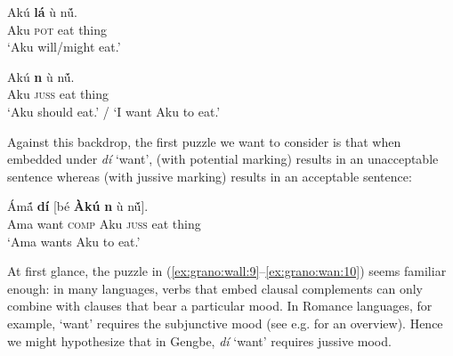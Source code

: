 \documentclass[output=paper,modfonts,nonflat]{langsci/langscibook}
\begin{document}
\ea \label{ex:grano:pot:7}
\gll Ak\'u \textbf{l\'a} {\D}\`u n\'{\~u}.\\
Aku \textsc{pot} eat thing\\
\glt `Aku will/might eat.' %
\z

\ea \label{ex:grano:juss:8}
\gll Ak\'u \textbf{n{\É}} {\D}\`u n\'{\~u}.\\
Aku \textsc{juss} eat thing\\
\glt`Aku should eat.' / `I want Aku to eat.' %
\z

Against this backdrop, the first puzzle we want to consider is that when embedded under \emph{d{\Z}\'i} `want',  (with potential marking) results in an unacceptable sentence whereas  (with jussive marking) results in an acceptable sentence:

\z

\ea \label{ex:grano:wan:10}
\gll \'Am\'{\~a} \textbf{d{\Z}\'i} [b\'e \textbf{\`Ak\'u} \textbf{n{\É}} {\D}\`u n\'{\~u}].\\
Ama want \textsc{comp} Aku \textsc{juss} eat thing\\
\glt `Ama wants Aku to eat.' %
\z

At first glance, the puzzle in (\ref{ex:grano:wall:9}--\ref{ex:grano:wan:10}) seems familiar enough: in many languages, verbs that embed clausal complements can only combine with clauses that bear a particular mood. In Romance languages, for example, `want' requires the subjunctive mood (see e.g. \cite{Palmer2001} for an overview). Hence we might hypothesize that in Gengbe, \emph{d{\Z}\'i} `want' requires jussive mood. 
\end{document}
